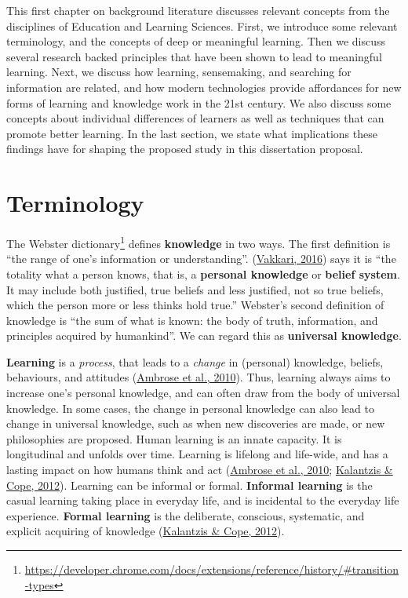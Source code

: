 \documentclass[a4paper, nobind]{templates/ociamthesis}
\begin{document}
This first chapter on background literature discusses relevant concepts
from the disciplines of Education and Learning Sciences. First, we
introduce some relevant terminology, and the concepts of deep or
meaningful learning. Then we discuss several research backed principles
that have been shown to lead to meaningful learning. Next, we discuss
how learning, sensemaking, and searching for information are related,
and how modern technologies provide affordances for new forms of
learning and knowledge work in the 21st century. We also discuss some
concepts about individual differences of learners as well as techniques
that can promote better learning. In the last section, we state what
implications these findings have for shaping the proposed study in this
dissertation proposal.

\hypertarget{sec:bg_learn_terminology}{%
\section{Terminology}\label{sec:bg_learn_terminology}}

The Webster dictionary\footnote{\url{https://developer.chrome.com/docs/extensions/reference/history/\#transition-types}} defines \textbf{knowledge} in two ways. The first
definition is ``the range of one's information or understanding''.
(\protect\hyperlink{ref-vakkari2016searching}{Vakkari, 2016}) says it is ``the totality what a person knows,
that is, a \textbf{personal knowledge} or \textbf{belief system}. It may include
both justified, true beliefs and less justified, not so true beliefs,
which the person more or less thinks hold true.'' Webster's second
definition of knowledge is ``the sum of what is known: the body of truth,
information, and principles acquired by humankind''. We can regard this
as \textbf{universal knowledge}.

\textbf{Learning} is a \emph{process}, that leads to a \emph{change} in (personal)
knowledge, beliefs, behaviours, and attitudes (\protect\hyperlink{ref-ambrose2010howa}{Ambrose et al., 2010}). Thus,
learning always aims to increase one's personal knowledge, and can often
draw from the body of universal knowledge. In some cases, the change in
personal knowledge can also lead to change in universal knowledge, such
as when new discoveries are made, or new philosophies are proposed.
Human learning is an innate capacity. It is longitudinal and unfolds
over time. Learning is lifelong and life-wide, and has a lasting impact
on how humans think and act (\protect\hyperlink{ref-ambrose2010howa}{Ambrose et al., 2010}; \protect\hyperlink{ref-kalantzis2012newa}{Kalantzis \& Cope, 2012}).
Learning can be informal or formal. \textbf{Informal learning} is the casual
learning taking place in everyday life, and is incidental to the
everyday life experience. \textbf{Formal learning} is the deliberate,
conscious, systematic, and explicit acquiring of knowledge
(\protect\hyperlink{ref-kalantzis2012newa}{Kalantzis \& Cope, 2012}).
\end{document}
